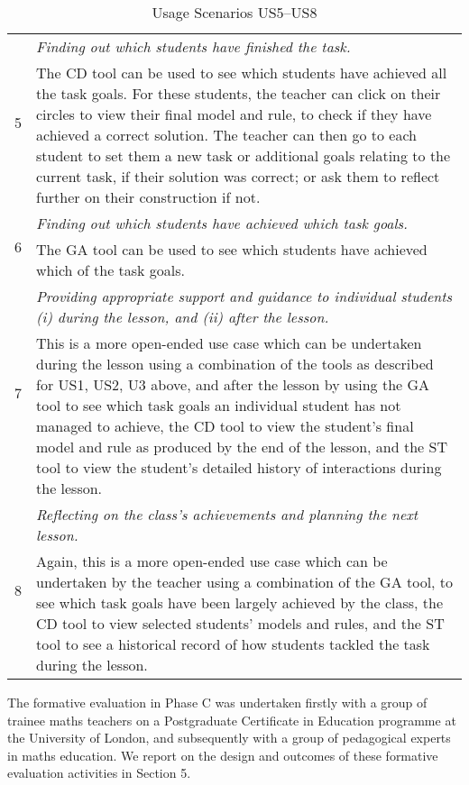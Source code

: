 \begin{table}[htbp]
  \begin{tabular}{|p{0.5cm}|p{12.5cm}|}
  \hline \multirow{2}{*}{5}
  & \emph{Finding out which students have finished the task.} \\
  \cline{2-2}
  & The CD tool can be used to see which students have achieved all
  the task goals. For these students, the teacher can click on their
  circles to view their final model and rule, to check if they have
  achieved a correct solution. The teacher can then go to each student
  to set them a new task or additional goals relating to the current
  task, if their solution was correct; or ask them to reflect further
  on their construction if not. \\
  \hline \multirow{2}{*}{6}
  & \emph{Finding out which students have achieved which task goals.} \\
  \cline{2-2}
  & The GA tool can be used to see which students have achieved which
  of the task goals. \\
  \hline \multirow{2}{*}{7}
  & \emph{Providing appropriate support and guidance to individual
  students (i) during the lesson, and (ii) after the lesson.} \\
  \cline{2-2}
  &  This is a more open-ended use case which can be undertaken during
  the lesson using a combination of the tools as described for US1,
  US2, U3 above, and after the lesson by using the GA tool to see
  which task goals an individual student has not managed to achieve,
  the CD tool to view the student's final model and rule as produced
  by the end of the lesson, and the ST tool to view the student's
  detailed history of interactions
  during the lesson.  \\
  \hline \multirow{2}{*}{8}
  & \emph{Reflecting on the class’s achievements and planning the next
  lesson.} \\
  \cline{2-2}
  &  Again, this is a more open-ended use case which can be undertaken by
  the teacher using a combination of the GA tool, to see which task
  goals have been largely achieved by the class, the CD tool to view
  selected students' models and rules, and the ST tool to see a
  historical record of how students tackled the task during the
  lesson.
   \\
  \hline
  \end{tabular}
  \caption{Usage Scenarios US5--US8}
  \label{tab:UsageScenariosB}
\end{table}
 

The formative evaluation in Phase C was undertaken firstly with a group of trainee
maths teachers on a Postgraduate Certificate in Education programme
at the University of London, and subsequently with a group of pedagogical 
experts in maths education. We report on the design and outcomes of these formative
evaluation activities in Section 5.
 
